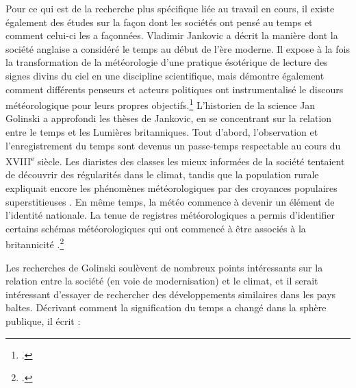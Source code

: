 \documentclass[a4paper,twoside,12pt]{article}
\begin{document}


Pour ce qui est de la recherche plus spécifique liée au travail en cours, il existe également des études sur la façon dont les sociétés ont pensé au temps et comment celui-ci les a façonnées. Vladimir Jankovic a décrit la manière dont la société anglaise a considéré le temps au début de l'ère moderne. Il expose à la fois la transformation de la météorologie d'une pratique ésotérique de lecture des signes divins du ciel en une discipline scientifique, mais démontre également comment différents penseurs et acteurs politiques ont instrumentalisé le discours météorologique pour leurs propres objectifs.\footcite{jankovic_reading_2001} L'historien de la science Jan Golinski a approfondi les thèses de Jankovic, en se concentrant sur la relation entre le temps et les Lumières britanniques. Tout d'abord, l'observation et l'enregistrement du temps sont devenus un passe-temps respectable au cours du XVIII\textsuperscript{e} siècle. Les diaristes des classes les mieux informées de la société tentaient de découvrir des régularités dans le climat, tandis que la population rurale expliquait encore les phénomènes météorologiques par des croyances populaires \og superstitieuses \fg{}. En même temps, la météo commence à devenir un élément de l'identité nationale. La tenue de registres météorologiques a permis d'identifier certains schémas météorologiques qui ont commencé à être associés à la \og britannicité \fg{}.\footcite{golinski_british_2007}

\label{golinski}Les recherches de Golinski soulèvent de nombreux points intéressants sur la relation entre la société (en voie de modernisation) et le climat, et il serait intéressant d'essayer de rechercher des développements similaires dans les pays baltes. Décrivant comment la signification du temps a changé dans la sphère publique, il écrit :
\end{document}
